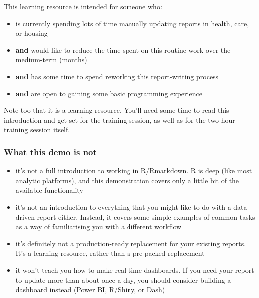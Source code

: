 \documentclass[
]{article}
\providecommand{\tightlist}{%
  \setlength{\itemsep}{0pt}\setlength{\parskip}{0pt}}
\begin{document}
This learning resource is intended for someone who:

\begin{itemize}
\tightlist
\item
  is currently spending lots of time manually updating reports in
  health, care, or housing
\item
  \textbf{and} would like to reduce the time spent on this routine work
  over the medium-term (months)
\item
  \textbf{and} has some time to spend reworking this report-writing
  process
\item
  \textbf{and} are open to gaining some basic programming experience
\end{itemize}

Note too that it is a learning resource. You'll need some time to read
this introduction and get set for the training session, as well as for
the two hour training session itself.

\hypertarget{what-this-demo-is-not}{%
\subsubsection{What this demo is not}\label{what-this-demo-is-not}}

\begin{itemize}
\tightlist
\item
  it's not a full introduction to working in
  \href{https://www.r-project.org/}{R}/\href{http://rmarkdown.rstudio.com}{Rmarkdown}.
  \href{https://www.r-project.org/}{R} is deep (like most analytic
  platforms), and this demonstration covers only a little bit of the
  available functionality
\item
  it's not an introduction to everything that you might like to do with
  a data-driven report either. Instead, it covers some simple examples
  of common tasks as a way of familiarising you with a different
  workflow
\item
  it's definitely not a production-ready replacement for your existing
  reports. It's a learning resource, rather than a pre-packed
  replacement
\item
  it won't teach you how to make real-time dashboards. If you need your
  report to update more than about once a day, you should consider
  building a dashboard instead
  (\href{https://powerbi.microsoft.com/en-gb/}{Power BI},
  \href{https://www.r-project.org/}{R}/\href{https://shiny.rstudio.com/}{Shiny},
  or \href{https://plotly.com/dash/}{Dash})
\end{itemize}
\end{document}
